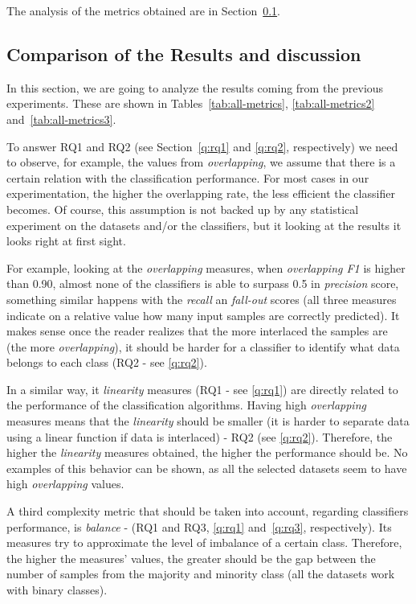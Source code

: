 The analysis of the metrics obtained are in Section~\ref{sec:compresults}.

\subsection{Comparison of the Results and discussion}\label{sec:compresults}

In this section, we are going to analyze the results coming from the
previous experiments. These are shown in Tables~\ref{tab:all-metrics}, 
\ref{tab:all-metrics2} and~\ref{tab:all-metrics3}. 

To answer RQ1 and RQ2 (see Section~\ref{q:rq1} and \ref{q:rq2}, respectively) we 
need to observe, for example, the values from \textit{overlapping}, we assume 
that there is a certain relation with the classification performance. For most 
cases in our experimentation, the higher the overlapping rate, the less 
efficient the classifier becomes. Of course, this assumption is not backed up by
any statistical experiment on the datasets and/or the classifiers, but it 
looking at the results it looks right at first sight.

For example, looking at the \textit{overlapping} measures, when 
\textit{overlapping F1} is higher than 0.90, almost none of the classifiers is 
able to surpass 0.5 in \textit{precision} score, something similar happens with 
the \textit{recall} an \textit{fall-out} scores (all three measures indicate on 
a relative value how many input samples are correctly predicted). It makes sense 
once the reader realizes that the more interlaced the samples are (the more 
\textit{overlapping}), it should be harder for a classifier to identify what 
data belongs to each class (RQ2 - see \ref{q:rq2}).

In a similar way, it \textit{linearity} measures (RQ1 - see \ref{q:rq1}) are 
directly related to the performance of the classification algorithms. Having
high \textit{overlapping} measures means that the \textit{linearity} should be 
smaller (it is harder to separate data using a linear function if data is 
interlaced) - RQ2 (see \ref{q:rq2}). Therefore, the higher the 
\textit{linearity} measures obtained, the higher the performance should be. No 
examples of this behavior can be shown, as all the selected datasets seem to
have high \textit{overlapping} values.

A third complexity metric that should be taken into account, regarding 
classifiers performance, is \textit{balance} - (RQ1 and RQ3, \ref{q:rq1} 
and~\ref{q:rq3}, respectively). Its measures try to approximate the level of 
imbalance of a certain class. Therefore, the higher the measures' values, the 
greater should be the gap between the number of samples from the majority and 
minority class (all the datasets work with binary classes).

